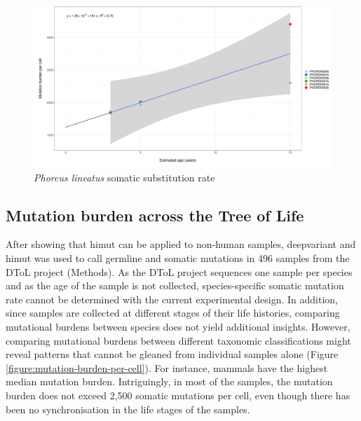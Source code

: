 \begin{figure}[htbp!]
\caption{\textit{Phorcus lineatus} somatic substitution rate}
\label{figure:xgPhoLine1-somatic-substituion-rate}
\begin{centering}
\includegraphics[width=\textwidth]{Vector/xgPhoLine1.somatic_substitution_rate.pdf}
\end{centering}
\end{figure}

\subsection{Mutation burden across the Tree of Life}

After showing that himut can be applied to non-human samples, deepvariant and himut was used to call germline and somatic mutations in 496 samples from the DToL project (Methods). As the DToL project sequences one sample per species and as the age of the sample is not collected, species-specific somatic mutation rate cannot be determined with the current experimental design. In addition, since samples are collected at different stages of their life histories, comparing mutational burdens between species does not yield additional insights. However, comparing mutational burdens between different taxonomic classifications might reveal patterns that cannot be gleaned from individual samples alone (Figure \ref{figure:mutation-burden-per-cell}). For instance, mammals have the highest median mutation burden. Intriguingly, in most of the samples, the mutation burden does not exceed 2,500 somatic mutations per cell, even though there has been no synchronisation in the life stages of the samples.  

